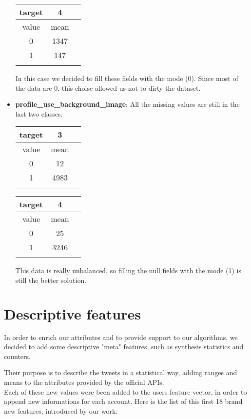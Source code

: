 \begin{itemize}
\begin{center}
		\begin{tabular}{ccc}
			\\target&4\\
			\hline\hline
			value&mean\\
			\hline\hline
			0&1347\\
			1&147\\\hline\\
		\end{tabular}
	\end{center}
	In this case we decided to fill these fields with the mode (0). Since most of the data are 0, this choise allowed us not to dirty the dataset.
	
	
	\item[\PencilRight]\textbf{profile\_use\_background\_image}: All the missing values are still in the last two classes.
	\begin{center}
		\begin{tabular}{ccc}
			\\target&3\\
			\hline\hline
			value&mean\\
			\hline\hline
			0&12\\
			1&4983\\\hline\\
		\end{tabular}
		
		\begin{tabular}{ccc}
			\\target&4\\
			\hline\hline
			value&mean\\
			\hline\hline
			0&25\\
			1&3246\\\hline\\
		\end{tabular}
	\end{center}
	This data is really unbalanced, so filling the null fields with the mode (1) is still the better solution.
	
\end{itemize}
\section{Descriptive features}

In order to enrich our attributes and to provide support to our algorithms, we decided to add some descriptive "meta" features, such as synthesis statistics and counters.

Their purpose is to describe the tweets in a statistical way, adding ranges and means to the attributes provided by the official APIs.\\
Each of these new values were been added to the users feature vector, in order to append new informations for each account.
Here is the list of this first 18 brand new features, introduced by our work:

